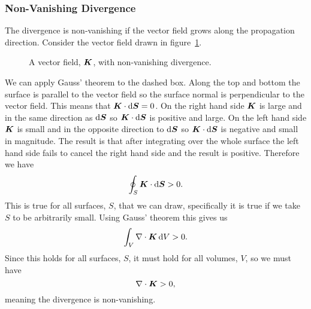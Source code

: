     \subsubsection{Non-Vanishing Divergence}
    The divergence is non-vanishing if the vector field grows along the propagation direction.
    Consider the vector field drawn in figure~\ref{fig:non-vanishing divergence}.
    \begin{figure}[ht]
        \centering
        \caption{A vector field, \(\bm{K}\), with non-vanishing divergence.}
        \label{fig:non-vanishing divergence}
    \end{figure}
    We can apply Gauss' theorem to the dashed box.
    Along the top and bottom the surface is parallel to the vector field so the surface normal is perpendicular to the vector field.
    This means that \(\bm{K}\cdot\dd\bm{S} = 0\).
    On the right hand side \(\bm{K}\) is large and in the same direction as \(\dd\bm{S}\) so \(\bm{K}\cdot\dd\bm{S}\) is positive and large.
    On the left hand side \(\bm{K}\) is small and in the opposite direction to \(\dd\bm{S}\) so \(\bm{K}\cdot\dd\bm{S}\) is negative and small in magnitude.
    The result is that after integrating over the whole surface the left hand side fails to cancel the right hand side and the result is positive.
    Therefore we have
    \[\oint_S\bm{K}\cdot\dd\bm{S} > 0.\]
    This is true for all surfaces, \(S\), that we can draw, specifically it is true if we take \(S\) to be arbitrarily small.
    Using Gauss' theorem this gives us
    \[\int_V\nabla\cdot\bm{K} \dd{V} > 0.\]
    Since this holds for all surfaces, \(S\), it must hold for all volumes, \(V\), so we must have
    \[\nabla\cdot\bm{K} > 0,\]
    meaning the divergence is non-vanishing.
    
